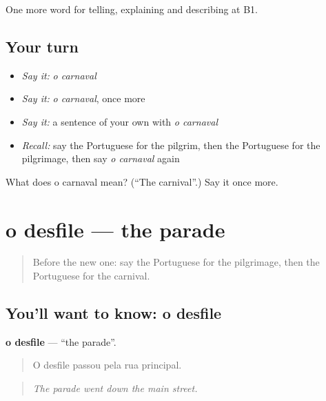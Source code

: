 \begin{grammarlens}[title={What you've built}]
One more word for telling, explaining and describing at B1.
\end{grammarlens}

\subsection*{Your turn}
\begin{itemize}
\raggedright
  \item \emph{Say it:} \emph{o carnaval}
  \item \emph{Say it:} \emph{o carnaval}, once more
  \item \emph{Say it:} a sentence of your own with \emph{o carnaval}
  \item \emph{Recall:} say the Portuguese for the pilgrim, then the Portuguese for the pilgrimage, then say \emph{o carnaval} again
\end{itemize}

\begin{tcolorbox}[breakable,colback=teal!4,colframe=teal!35!black,title={Before you move on}]
What does o carnaval mean? (\textquotedblleft{}The carnival\textquotedblright{}.) Say it once more.
\end{tcolorbox}
\section[o desfile]{o desfile — the parade}

\label{lesson:PT-C321-desfile}



\begin{quote}
Before the new one: say the Portuguese for the pilgrimage, then the Portuguese for the carnival.
\end{quote}

\subsection*{You'll want to know: o desfile}
\textbf{o desfile} — \textquotedblleft{}the parade\textquotedblright{}.

\begin{quote}
O desfile passou pela rua principal.
\end{quote}

\begin{quote}
\emph{The parade went down the main street.}
\end{quote}

